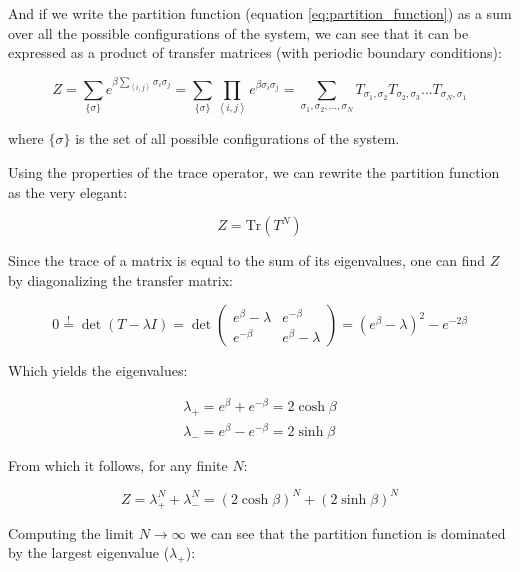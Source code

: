 And if we write the partition function (equation \ref{eq:partition_function}) as a sum over all the possible configurations of the system, we can see that it can be expressed as a product of transfer matrices (with periodic boundary conditions):

\begin{equation}
  Z = \sum_{\{\sigma\}} e^{\beta \sum_{\left< i, j \right>} \sigma_i \sigma_j } =
  \sum_{\{\sigma\}} \prod_{\left< i, j \right>} e^{\beta \sigma_i \sigma_j } = 
  \sum_{\sigma_1, \sigma_2, \ldots, \sigma_N} T_{\sigma_1, \sigma_2} T_{\sigma_2, \sigma_3} \ldots T_{\sigma_N, \sigma_1}
\end{equation}

where $\{\sigma\}$ is the set of all possible configurations of the system.

Using the properties of the trace operator, we can rewrite the partition function as the very elegant:

\begin{equation}
  Z = \mathrm{Tr} \left( T^N \right)
\end{equation}

Since the trace of a matrix is equal to the sum of its eigenvalues, one can find $Z$ by diagonalizing the transfer matrix:

\begin{equation}
  0 \overset{!}{=} \det{\left(T - \lambda I\right)} = \det {
    \begin{pmatrix}
      e^{\beta} - \lambda & e^{-\beta} \\
      e^{-\beta} & e^{\beta} - \lambda
    \end{pmatrix}
  } = \left( e^{\beta} - \lambda \right)^2 - e^{-2\beta}
\end{equation}

Which yields the eigenvalues:

\begin{align*}
  \lambda_{+} = e^{\beta} + e^{-\beta} = 2 \cosh{\beta} \\
  \lambda_{-} = e^{\beta} - e^{-\beta} = 2 \sinh{\beta}
\end{align*}

From which it follows, for any finite $N$:

\begin{equation}
  Z = \lambda_{+}^N + \lambda_{-}^N = \left( 2 \cosh{\beta} \right)^N + \left( 2 \sinh{\beta} \right)^N
\end{equation}

Computing the limit $N \rightarrow \infty$ we can see that the partition function is dominated by the largest eigenvalue ($\lambda_{+}$):

